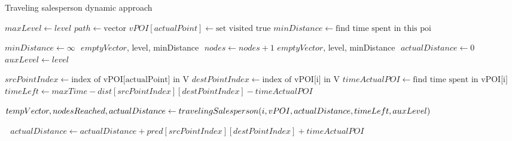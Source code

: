 \documentclass{article}
\begin{document}
    \begin{algorithm}[H]
    \caption{Traveling salesperson dynamic approach}
    \begin{algorithmic}[1]
    
        \State $maxLevel \gets{level}$
        \State $path \gets \text{vector}$
        \State $vPOI[actualPoint]\gets \text{set visited true}$
        \State $minDistance \gets \text{find time spent in this poi}$
        \State $ $ 
        
        \State $minDistance \gets \infty$
        \State $ $
        \Return $emptyVector$, level, minDistance  
        \EndIf 
        \State $ $
        \State $nodes \gets nodes + 1$ 
        \Return $emptyVector$, level, minDistance  
        \EndIf
        \State $ $
        \newpage
                \State $actualDistance \gets 0$
                \State $auxLevel \gets level$

                \State $srcPointIndex \gets \text{index of vPOI[actualPoint] in V}$
                \State $destPointIndex \gets \text{index of vPOI[i] in V}$ 
                \State $timeActualPOI \gets \text{find time spent in vPOI[i]}$
                \State $timeLeft \gets maxTime - dist[srcPointIndex][destPointIndex] - timeActualPOI$
                \State $ $
                
                \State $tempVector,nodesReached,actualDistance \gets travelingSalesperson(i, vPOI,\newline actualDistance, timeLeft, auxLevel)$
                
                \State $ $
                \State $ $
                \State $actualDistance \gets actualDistance + pred[srcPointIndex][destPointIndex] + timeActualPOI$
                
                \State $ $
             

\end{algorithmic}
\end{algorithm}
\end{document}
